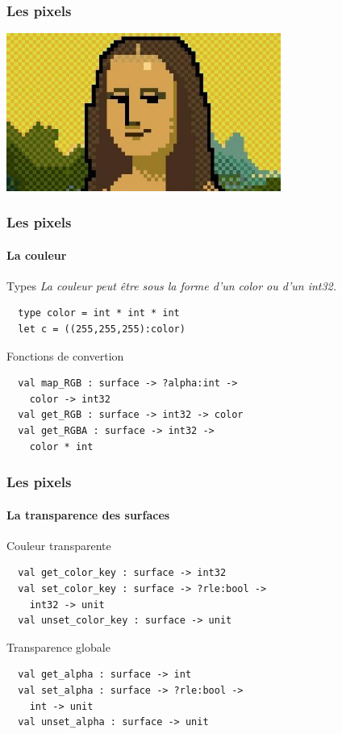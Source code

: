 \begin{frame}
	\frametitle{Les pixels}
	\begin{center}
		\includegraphics[width=9cm]{pics/Joconde-pixel.jpg}
	\end{center}
\end{frame}

\begin{frame}[fragile]
	\frametitle{Les pixels}
	\framesubtitle{La couleur}
	\begin{block}{Types}
		\textit{La couleur peut être sous la forme d'un color ou d'un int32.}
		\begin{lstlisting}
  type color = int * int * int
  let c = ((255,255,255):color)
		\end{lstlisting}
	\end{block}
	\begin{block}{Fonctions de convertion}
		\begin{lstlisting}
  val map_RGB : surface -> ?alpha:int -> 
    color -> int32
  val get_RGB : surface -> int32 -> color
  val get_RGBA : surface -> int32 -> 
    color * int
		\end{lstlisting}
	\end{block}
\end{frame}

\begin{frame}[fragile]
	\frametitle{Les pixels}
	\framesubtitle{La transparence des surfaces}
	\begin{block}{Couleur transparente}
		\begin{lstlisting}
  val get_color_key : surface -> int32
  val set_color_key : surface -> ?rle:bool -> 
    int32 -> unit
  val unset_color_key : surface -> unit
		\end{lstlisting}
	\end{block}
	\begin{block}{Transparence globale}
		\begin{lstlisting}
  val get_alpha : surface -> int
  val set_alpha : surface -> ?rle:bool -> 
    int -> unit
  val unset_alpha : surface -> unit
		\end{lstlisting}
	\end{block}
\end{frame}

